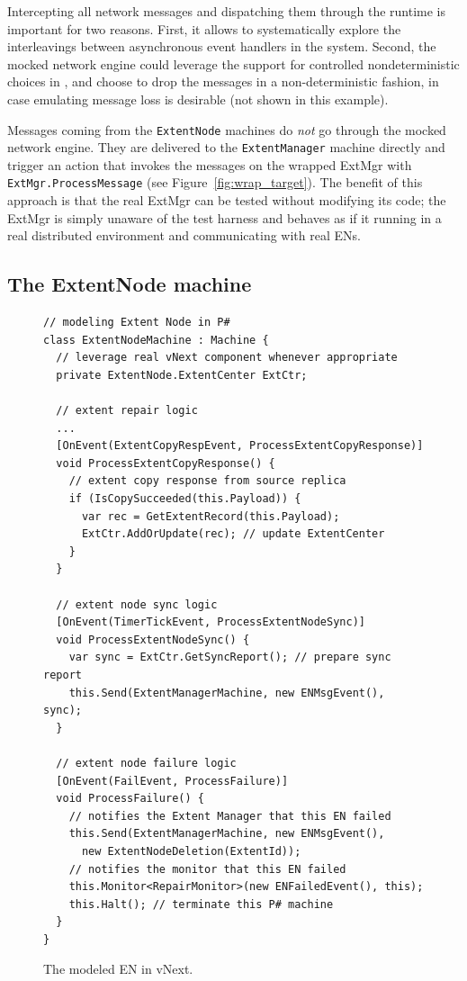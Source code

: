 Intercepting all network messages and dispatching them through the \psharp runtime is important for two reasons. First, it allows \psharp to systematically explore the interleavings between asynchronous event handlers in the system. Second, the mocked network engine could leverage the support for controlled nondeterministic choices in \psharp, and choose to drop the messages in a non-deterministic fashion, in case emulating message loss is desirable (not shown in this example).

Messages coming from the \texttt{ExtentNode} machines do \emph{not} go through the mocked network engine. They are delivered to the \texttt{ExtentManager} machine directly and trigger an action that invokes the messages on the wrapped ExtMgr with \texttt{ExtMgr.ProcessMessage} (see Figure~\ref{fig:wrap_target}). The benefit of this approach is that the real ExtMgr can be tested without modifying its code; the ExtMgr is simply unaware of the \psharp test harness and behaves as if it running in a real distributed environment and communicating with real ENs.

\subsection{The ExtentNode machine}
\label{sec:method:mock_en}

\begin{figure}[t]
\begin{lstlisting}
// modeling Extent Node in P#
class ExtentNodeMachine : Machine {
  // leverage real vNext component whenever appropriate
  private ExtentNode.ExtentCenter ExtCtr;

  // extent repair logic
  ...
  [OnEvent(ExtentCopyRespEvent, ProcessExtentCopyResponse)]
  void ProcessExtentCopyResponse() {
    // extent copy response from source replica
    if (IsCopySucceeded(this.Payload)) {
      var rec = GetExtentRecord(this.Payload);
      ExtCtr.AddOrUpdate(rec); // update ExtentCenter
    }
  }

  // extent node sync logic
  [OnEvent(TimerTickEvent, ProcessExtentNodeSync)]
  void ProcessExtentNodeSync() {
    var sync = ExtCtr.GetSyncReport(); // prepare sync report
    this.Send(ExtentManagerMachine, new ENMsgEvent(), sync);
  }
  
  // extent node failure logic
  [OnEvent(FailEvent, ProcessFailure)]
  void ProcessFailure() {
    // notifies the Extent Manager that this EN failed
    this.Send(ExtentManagerMachine, new ENMsgEvent(),
      new ExtentNodeDeletion(ExtentId));
    // notifies the monitor that this EN failed
    this.Monitor<RepairMonitor>(new ENFailedEvent(), this);
    this.Halt(); // terminate this P# machine
  }
}
\end{lstlisting}
\vspace{-4mm}
\caption{The modeled EN in vNext.}
\label{fig:mocked_en}
\vspace{-2mm}
\end{figure}

